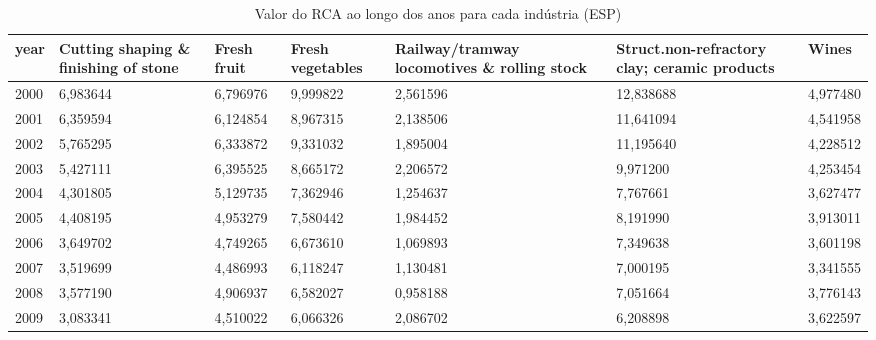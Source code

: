 \begin{table}
\centering
\caption{Valor do RCA ao longo dos anos para cada indústria (ESP)}
\begin{tabular}{p{1cm}p{2cm}p{2cm}p{2cm}p{2cm}p{2cm}p{2cm}}
\toprule
 year &  Cutting shaping \& finishing of stone &  Fresh fruit &  Fresh vegetables &  Railway/tramway locomotives \& rolling stock &  Struct.non-refractory clay; ceramic products &    Wines \\
\midrule
 2000 &                              6,983644 &     6,796976 &          9,999822 &                                     2,561596 &                                     12,838688 & 4,977480 \\
 2001 &                              6,359594 &     6,124854 &          8,967315 &                                     2,138506 &                                     11,641094 & 4,541958 \\
 2002 &                              5,765295 &     6,333872 &          9,331032 &                                     1,895004 &                                     11,195640 & 4,228512 \\
 2003 &                              5,427111 &     6,395525 &          8,665172 &                                     2,206572 &                                      9,971200 & 4,253454 \\
 2004 &                              4,301805 &     5,129735 &          7,362946 &                                     1,254637 &                                      7,767661 & 3,627477 \\
 2005 &                              4,408195 &     4,953279 &          7,580442 &                                     1,984452 &                                      8,191990 & 3,913011 \\
 2006 &                              3,649702 &     4,749265 &          6,673610 &                                     1,069893 &                                      7,349638 & 3,601198 \\
 2007 &                              3,519699 &     4,486993 &          6,118247 &                                     1,130481 &                                      7,000195 & 3,341555 \\
 2008 &                              3,577190 &     4,906937 &          6,582027 &                                     0,958188 &                                      7,051664 & 3,776143 \\
 2009 &                              3,083341 &     4,510022 &          6,066326 &                                     2,086702 &                                      6,208898 & 3,622597 \\

\end{tabular}
\end{table}
